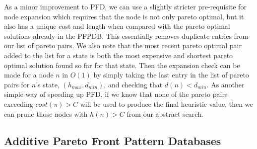\documentclass[letterpaper]{article} %
\begin{document}
As a minor improvement to PFD,
we can use a slightly stricter pre-requisite for node
expansion which requires that the node is not only pareto optimal,
but it also has a unique cost and length when compared with
the pareto optimal solutions already in the PFPDB.
This essentially removes duplicate entries from our list of pareto pairs.
We also note that the most recent pareto optimal pair added to the list for a state
is both the most expensive and shortest pareto optimal solution found so far for that state.
Then the expansion check can be made for a node \(n\) in \(O(1)\)
by simply taking the last entry in the list of pareto pairs for \(n\)'s state,
\((h_{max}, d_{min})\), and checking that \(d(n) < d_{min}\).
As another simple way of speeding up PFD, if we know that
none of the pareto pairs exceeding \(cost(\pi) > C\) will be used
to produce the final heuristic value,
then we can prune those nodes with \(h(n) > C\) from our abstract search.

\subsection{Additive Pareto Front Pattern Databases}
\end{document}
